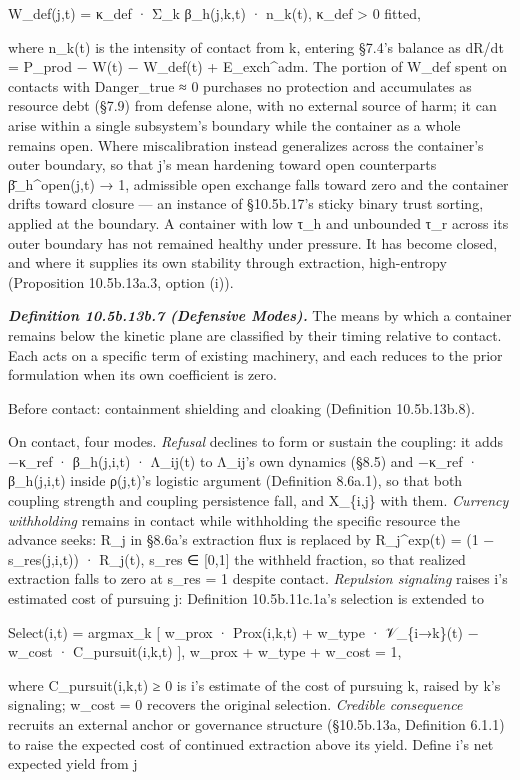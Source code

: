 \documentclass[
]{article}
\begin{document}
W\_def(j,t) = κ\_def · Σ\_k β\_h(j,k,t) · n\_k(t), κ\_def \textgreater{}
0 fitted,

where n\_k(t) is the intensity of contact from k, entering §7.4's balance
as dR/dt = P\_prod − W(t) − W\_def(t) + E\_exch\^{}adm. The portion of
W\_def spent on contacts with Danger\_true ≈ 0 purchases no protection
and accumulates as resource debt (§7.9) from defense alone, with no
external source of harm; it can arise within a single subsystem's
boundary while the container as a whole remains open. Where
miscalibration instead generalizes across the container's outer
boundary, so that j's mean hardening toward open counterparts
β̄\_h\^{}open(j,t) → 1, admissible open exchange falls toward zero and
the container drifts toward closure --- an instance of §10.5b.17's sticky
binary trust sorting, applied at the boundary. A container with low τ\_h
and unbounded τ\_r across its outer boundary has not remained healthy
under pressure. It has become closed, and where it supplies its own
stability through extraction, high-entropy (Proposition 10.5b.13a.3,
option (i)).

\emph{\textbf{Definition 10.5b.13b.7 (Defensive Modes).}} The means by
which a container remains below the kinetic plane are classified by
their timing relative to contact. Each acts on a specific term of
existing machinery, and each reduces to the prior formulation when its
own coefficient is zero.

Before contact: containment shielding and cloaking (Definition
10.5b.13b.8).

On contact, four modes. \emph{Refusal} declines to form or sustain the
coupling: it adds −κ\_ref · β\_h(j,i,t) · Λ\_ij(t) to Λ\_ij's own dynamics
(§8.5) and −κ\_ref · β\_h(j,i,t) inside ρ(j,t)'s logistic argument
(Definition 8.6a.1), so that both coupling strength and coupling
persistence fall, and X\_\{i,j\} with them. \emph{Currency withholding}
remains in contact while withholding the specific resource the advance
seeks: R\_j in §8.6a's extraction flux is replaced by R\_j\^{}exp(t) =
(1 − s\_res(j,i,t)) · R\_j(t), s\_res ∈ {[}0,1{]} the withheld fraction, so
that realized extraction falls to zero at s\_res = 1 despite contact.
\emph{Repulsion signaling} raises i's estimated cost of pursuing j:
Definition 10.5b.11c.1a's selection is extended to

Select(i,t) = argmax\_k {[} w\_prox · Prox(i,k,t) + w\_type ·
𝒱\_\{i→k\}(t) − w\_cost · C\_pursuit(i,k,t) {]}, w\_prox + w\_type +
w\_cost = 1,

where C\_pursuit(i,k,t) ≥ 0 is i's estimate of the cost of pursuing k,
raised by k's signaling; w\_cost = 0 recovers the original selection.
\emph{Credible consequence} recruits an external anchor or governance
structure (§10.5b.13a, Definition 6.1.1) to raise the expected cost of
continued extraction above its yield. Define i's net expected yield from
j
\end{document}
